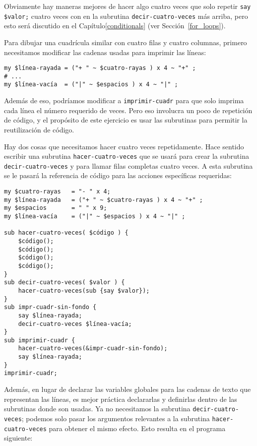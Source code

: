 Obviamente hay maneras mejores de hacer algo cuatro veces
que solo repetir \verb|say $valor;| cuatro veces con 
en la subrutina {\tt decir-cuatro-veces} más arriba, pero esto será discutido
en el Capítulo\ref{conditionals} (ver Sección~\ref{for_loops}).

Para dibujar una cuadrícula similar con cuatro filas y cuatro columnas,
primero necesitamos modificar las cadenas usadas para imprimir las
líneas:

\begin{verbatim}
my $línea-rayada = ("+ " ~ $cuatro-rayas ) x 4 ~ "+" ;
# ...
my $línea-vacía  = ("|" ~ $espacios ) x 4 ~ "|" ;
\end{verbatim}

Además de eso, podríamos modificar a {\tt imprimir-cuadr} para que 
solo imprima cada línea el número requerido de veces. Pero eso
involucra un poco de repetición de código, y el propósito de
este ejercicio es usar las subrutinas para permitir la reutilización
de código.

Hay dos cosas que necesitamos hacer cuatro veces repetidamente. Hace sentido
escribir una subrutina {\tt hacer-cuatro-veces} que se usará para crear
la subrutina {\tt decir-cuatro-veces} y para llamar filas completas
cuatro veces. A esta subrutina se le pasará la referencia de código para 
las acciones específicas requeridas:

\begin{verbatim}
my $cuatro-rayas   = "- " x 4;
my $línea-rayada   = ("+ " ~ $cuatro-rayas ) x 4 ~ "+" ;
my $espacios       = " " x 9;
my $línea-vacía    = ("|" ~ $espacios ) x 4 ~ "|" ;

sub hacer-cuatro-veces( $código ) {
    $código();
    $código();
    $código();
    $código();
}
sub decir-cuatro-veces( $valor ) {
    hacer-cuatro-veces(sub {say $valor});
}
sub impr-cuadr-sin-fondo {
    say $línea-rayada;
    decir-cuatro-veces $línea-vacía;
}
sub imprimir-cuadr {
    hacer-cuatro-veces(&impr-cuadr-sin-fondo);
    say $línea-rayada;
}
imprimir-cuadr;
\end{verbatim}

Además, en lugar de declarar las variables globales para las
cadenas de texto que representan las líneas, es mejor práctica 
declararlas y definirlas dentro de las subrutinas donde son usadas.
Ya no necesitamos la subrutina {\tt decir-cuatro-veces}; podemos
solo pasar los argumentos relevantes a la subrutina 
{\tt hacer-cuatro-veces} para obtener el mismo efecto. Esto
resulta en el programa siguiente:

